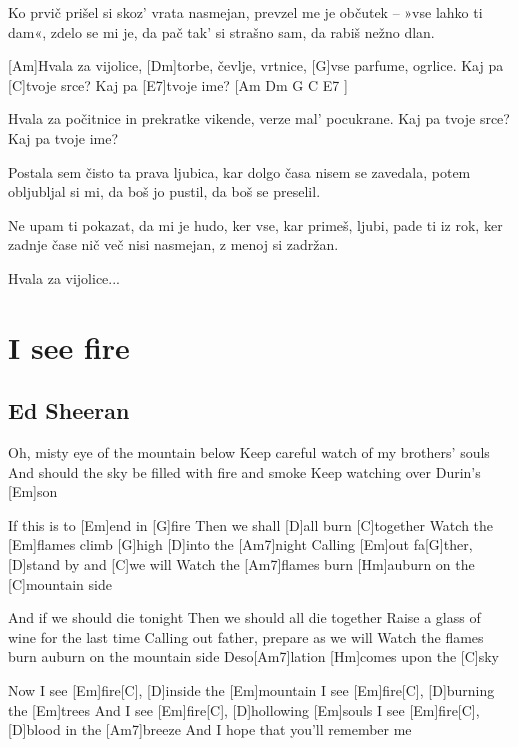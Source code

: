 \documentclass[a4paper,12pt]{article}
\begin{document}
\begin{multicols}{2}
\begin{guitar}
Ko prvič prišel si skoz’ vrata nasmejan, 
prevzel me je občutek – »vse lahko ti dam«, 
zdelo se mi je, da pač tak’ si strašno sam, 
da rabiš nežno dlan. 


[Am]Hvala  za  vijolice,
[Dm]torbe, čevlje, vrtnice,
[G]vse parfume, ogrlice.
Kaj pa [C]tvoje srce?
Kaj pa [E7]tvoje ime?  [Am Dm G C E7 ]


Hvala za počitnice 
in prekratke vikende, 
verze mal’ pocukrane. 
Kaj pa tvoje srce? 
Kaj pa tvoje ime? 


Postala sem čisto ta prava ljubica, 
kar dolgo časa nisem se zavedala, 
potem obljubljal si mi, da boš jo pustil, 
da boš se preselil. 


Ne upam ti pokazat, da mi je hudo, 
ker vse, kar primeš, ljubi, pade ti iz rok, 
ker zadnje čase nič več nisi nasmejan, 
z menoj si zadržan. 


Hvala za vijolice...

\end{guitar}
\section{I see fire}
\subsection*{Ed Sheeran}
\begin{guitar}
Oh, misty eye of the mountain below
Keep careful watch of my brothers' souls
And should the sky be filled 
with fire and smoke
Keep watching over Durin's [Em]son



If this is to [Em]end in [G]fire
Then we shall [D]all burn [C]together
Watch the [Em]flames climb [G]high [D]into the [Am7]night
Calling [Em]out fa[G]ther, [D]stand by and [C]we will
Watch the [Am7]flames burn 
[Hm]auburn on the [C]mountain side



And if we should die tonight
Then we should all die together
Raise a glass of wine for the last time
Calling out father, prepare as we will
Watch the flames burn 
auburn on the mountain side
Deso[Am7]lation [Hm]comes upon the [C]sky



Now I see [Em]fire[C],  [D]inside the [Em]mountain
I see [Em]fire[C],  [D]burning the [Em]trees 
And I see [Em]fire[C],  [D]hollowing [Em]souls
I see [Em]fire[C],  [D]blood in the [Am7]breeze
And I hope that you'll remember me




\end{guitar}
\end{multicols}
\end{document}
